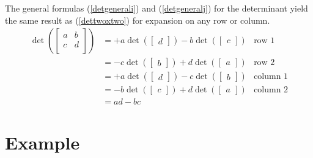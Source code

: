 \documentclass{article}%
\begin{document}
\begin{multicols}{2}
The general formulas (\ref{detgenerali}) and (\ref{detgeneralj}) for the determinant yield the same result as (\ref{dettwoxtwo}) for expansion on any row or column.
\begin{align}
\det\left (\begin{bmatrix} a & b\\ c & d\\ \end{bmatrix} \right)
 &= +a \det\left(  \begin{bmatrix} d \end{bmatrix} \right) - b \det\left(  \begin{bmatrix} c \end{bmatrix} \right) &\text{row 1} \\
 &= -c \det\left(  \begin{bmatrix} b \end{bmatrix} \right) + d \det\left(  \begin{bmatrix} a \end{bmatrix} \right) &\text{row 2} \\
 &= +a \det\left(  \begin{bmatrix} d \end{bmatrix} \right) - c \det\left(  \begin{bmatrix} b \end{bmatrix} \right) &\text{column 1} \\
 &= -b \det\left(  \begin{bmatrix} c \end{bmatrix} \right) +d \det\left(  \begin{bmatrix} a \end{bmatrix} \right) &\text{column 2} \\
 &= ad - bc
\end{align}

\section{Example}
\label{Example}


\end{multicols}
\end{document}

